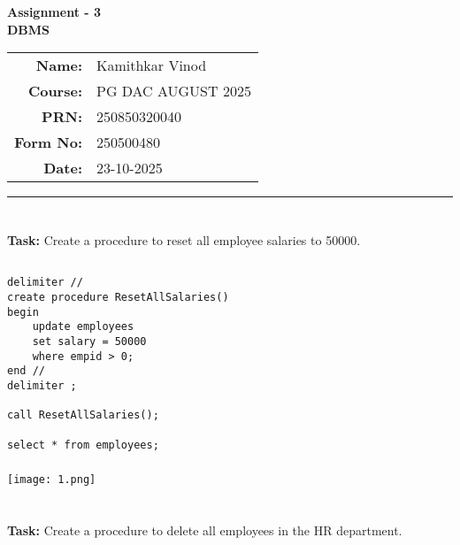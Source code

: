 \documentclass[12pt,a4paper]{article}
\begin{document}
\begin{center}
    \LARGE \textbf{Assignment - 3} \\[0.5cm]
    \Large \textbf{DBMS} \\[1cm]

    \begin{tabular}{rl}
        \textbf{Name:} & Kamithkar Vinod \\
        \textbf{Course:} & PG DAC AUGUST 2025 \\
        \textbf{PRN:} & 250850320040 \\
        \textbf{Form No:} & 250500480 \\
        \textbf{Date:} & 23-10-2025 \\
    \end{tabular}
\end{center}

\vspace{1cm}
\hrule
\vspace{0.5cm}


\section{}
\textbf{Task:} Create a procedure to reset all employee salaries to 50000.

\subsection{}
\begin{lstlisting}
delimiter //
create procedure ResetAllSalaries()
begin
    update employees
    set salary = 50000
    where empid > 0;
end //
delimiter ;

call ResetAllSalaries();

select * from employees;
\end{lstlisting}

\subsubsection{}
\begin{center}
    \texttt{[image: 1.png]}
\end{center}


\section{}
\textbf{Task:} Create a procedure to delete all employees in the HR department.
\end{document}
